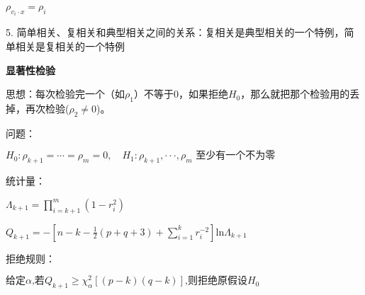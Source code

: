 \documentclass[10pt,a4paper]{ctexart} %
\begin{document}
\begin{multicols*}{3}
		$\rho_{v_i \cdot x}=\rho_i$
		
		5. 简单相关、复相关和典型相关之间的关系：复相关是典型相关的一个特例，简单相关是复相关的一个特例
		
		\textbf{显著性检验}
		
		思想：每次检验完一个（如$\rho_1$）不等于0，如果拒绝$H_0$，那么就把那个检验用的丢掉，再次检验($\rho_2 \neq 0$)。
		
		问题：
		
		$H_0:\rho_{k+1}=\cdots=\rho_m=0,\quad H_1:\rho_{k+1},\cdotp\cdotp\cdotp,\rho_m\text{ 至少有一个不为零}$
		
		统计量：
		
		$\Lambda_{k+1}=\prod_{i=k+1}^m(1-r_i^2)$
		
		$Q_{k+1}=-\left[n-k-\frac{1}{2}(p+q+3)+\sum_{i=1}^kr_i^{-2}\right]\mathrm{ln}\Lambda_{k+1}$
		
		拒绝规则：
		
		$\text{给定}\alpha \text{,若}Q_{k+1}\geqslant\chi_{\alpha}^{2}\left[\left(p-k\right)\left(q-k\right)\right]
		\text{,则拒绝原假设}H_0$
		
	\end{multicols*}
\end{document}
